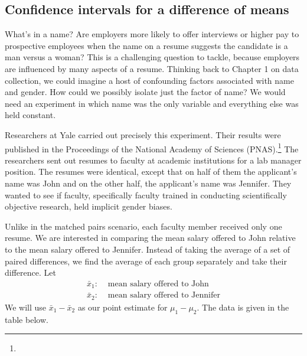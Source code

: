 \D{\newpage}

\subsection{Confidence intervals for a difference of means}

\newcommand{\johnn}{63}
\newcommand{\jennifern}{64}
\newcommand{\johnmean}{30,238}
\newcommand{\jennifermean}{26,508}
\newcommand{\johnsd}{5567}
\newcommand{\jennifersd}{7247}
\newcommand{\johnjenniferSE}{1151}

What’s in a name?  Are employers more likely to offer interviews or higher pay to prospective employees when the name on a resume suggests the candidate is a man versus a woman?  This is a challenging question to tackle, because employers are influenced by many aspects of a resume.  Thinking back to Chapter 1 on data collection, we could imagine a host of confounding factors associated with name and gender.  How could we possibly isolate just the factor of name?  We would need an experiment in which name was the only variable and everything else was held constant.  

Researchers at Yale carried out precisely this experiment.  Their results were published in the Proceedings of the National Academy of Sciences (PNAS).\footnote{} The researchers sent out resumes to faculty at academic institutions for a lab manager position.  The resumes were identical, except that on half of them the applicant’s name was John and on the other half, the applicant's name was Jennifer.  They wanted to see if faculty, specifically faculty trained in conducting scientifically objective research, held implicit gender biases.  

Unlike in the matched pairs scenario, each faculty member received only one resume.  We are interested in comparing the mean salary offered to John relative to the mean salary offered to Jennifer.  Instead of taking the average of a set of paired differences, we find the average of each group separately and take their difference.  Let
\begin{align*}
\bar{x}_1:& \text{ mean salary offered to John}\\
\bar{x}_2: &\text{ mean salary offered to Jennifer}
\end{align*}
We will use $\bar{x}_1 - \bar{x}_2$ as our point estimate for $\mu_1-\mu_2$.  The data is given in the table below.

